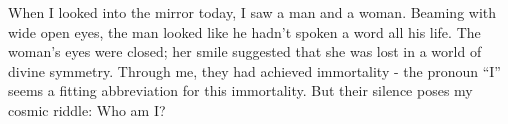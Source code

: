 \documentclass{article}
\begin{document}
\newline

When I looked into the mirror today, I saw a man and a woman. Beaming
with wide open eyes, the man looked like he hadn't spoken a word all his
life. The woman's eyes were closed; her smile suggested that she was
lost in a world of divine symmetry. Through me, they had achieved
immortality - the pronoun ``I'' seems a fitting abbreviation for this
immortality. But their silence poses my cosmic riddle: Who am I?
\end{document}
